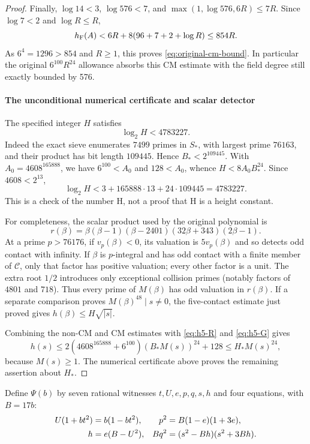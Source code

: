 \begin{proof}
Finally, $\log14<3$, $\log576<7$, and
$\max(1,\log576,6R)\le7R$. Since $\log7<2$ and $\log R\le R$,
\[
 h_{\rm F}(A)<6R+8(96+7+2+\log R)
             \le854R.
\]
As $6^4=1296>854$ and $R\ge1$, this proves
\eqref{eq:original-cm-bound}. In particular the original
$6^{100}R^{24}$ allowance absorbs this CM estimate with the field
degree still exactly bounded by 576.

\paragraph{The unconditional numerical certificate and scalar detector}
The specified integer $H$ satisfies
\[
 \log_2H<4783227.
\]
Indeed the exact sieve enumerates $7499$ primes in $S_*$, with largest
prime $76163$, and their product has bit length $109445$. Hence
$B_*<2^{109445}$. With $A_0=4608^{165888}$, we have
$6^{100}<A_0$ and $128<A_0$, whence $H<8A_0B_*^{24}$. Since $4608<2^{13}$,
\[
 \log_2H<3+165888\cdot13+24\cdot109445=4783227.
\]
This is a check of the number H, not a proof that H is a height constant.

For completeness, the scalar product used by the original polynomial is
\[
 r(\beta)=\beta(\beta-1)(\beta-2401)(32\beta+343)(2\beta-1).
\]
At a prime $p>76176$, if $v_p(\beta)<0$, its valuation is
$5v_p(\beta)$ and so detects odd contact with infinity. If $\beta$ is
$p$-integral and has odd contact with a finite member of $\mathcal C$,
only that factor has positive valuation; every other factor is a unit.
The extra root $1/2$ introduces only exceptional collision primes
(notably factors of $4801$ and $718$). Thus every prime of $M(\beta)$ has
odd valuation in $r(\beta)$. If a separate comparison proves
$M(\beta)^{48}\mid s\ne0$, the five-contact estimate just proved gives
$h(\beta)\le H\sqrt{|s|}$.

Combining the non-CM and CM estimates with \eqref{eq:h5-R} and
\eqref{eq:h5-G} gives
\[
 h(s)\le 2(4608^{165888}+6^{100})(B_*M(s))^{24}+128
       \le H_*M(s)^{24},
\]
because $M(s)\ge1$. The numerical certificate above proves the
remaining assertion about $H_*$.
\end{proof}


Define $\Psi(b)$ by seven rational witnesses $t,U,e,p,q,s,h$ and four
equations, with $B=17b$:
\begin{align}
 U(1+bt^2)&=b(1-bt^2),&
 p^2&=B(1-e)(1+3e),\label{eq:o8-pole}\\
 h&=e(B-U^2),&
 Bq^2&=(s^2-Bh)(s^2+3Bh).\notag
\end{align}

